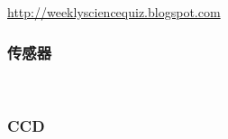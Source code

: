 \documentclass{beamer}
\begin{document}
{{{{\begin{frame}
  {\hspace{3em}}
  
  {\hspace{7em}}\href{http://weeklysciencequiz.blogspot.com}{http://weeklysciencequiz.blogspot.com}
\end{frame}}{\begin{frame}
  \frametitle{传感器}
  
  \
  
\end{frame}}{\begin{frame}
  \frametitle{CCD}
  
  \
  

\end{frame}}}}}
\end{document}
